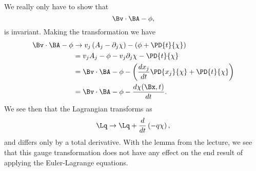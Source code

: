 {%
%
We really only have to show that
%
\begin{equation}\label{eqn:classicalMechanicsPs1:140}
\Bv \cdot \BA - \phi,
\end{equation}
%
is invariant.  Making the transformation we have
%
\begin{equation}\label{eqn:classicalMechanicsPs1:600}
\begin{aligned}
\Bv \cdot \BA - \phi
&\rightarrow
v_j \left(A_j - \partial_j \chi \right) - \left(\phi + \PD{t}{\chi} \right) \\
&=
v_j A_j - \phi - v_j \partial_j \chi - \PD{t}{\chi} \\
&=
\Bv \cdot \BA - \phi
- \left( \frac{d x_j}{dt} \PD{x_j}{\chi} + \PD{t}{\chi} \right) \\
&=
\Bv \cdot \BA - \phi
- \frac{d \chi(\Bx, t)}{dt}.
\end{aligned}
\end{equation}
%
We see then that the Lagrangian transforms as
%
\begin{equation}\label{eqn:classicalMechanicsPs1:160}
\Lq \rightarrow \Lq + \frac{d}{dt}\left( -q \chi \right),
\end{equation}
%
and differs only by a total derivative.  With the lemma from the lecture, we see that this gauge transformation does not have any effect on the end result of applying the Euler-Lagrange equations.
} %
